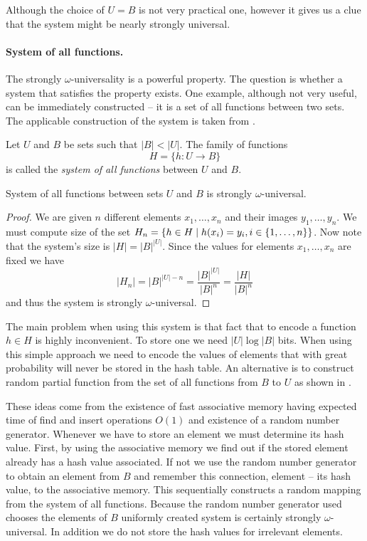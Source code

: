 Although the choice of $U = B$ is not very practical one, however it gives us a clue that the system might be nearly strongly universal.

\paragraph{System of all functions.}
The strongly $\omega$-universality is a powerful property. The question is whether a system that satisfies the property exists. One example, although not very useful, can be immediately constructed -- it is a set of all functions between two sets. The applicable construction of the system is taken from \cite{1382617}.

\begin{definition}
Let $U$ and $B$ be sets such that $|B| < |U|$. The family of functions
\[
H = \{h: U \rightarrow B \}
\]
is called the \emph{system of all functions} between $U$ and $B$.
\end{definition}

\begin{remark}
System of all functions between sets $U$ and $B$ is strongly $\omega$-universal.
\end{remark}
\begin{proof}
We are given $n$ different elements $x_1, \dots, x_n$ and their images $y_1, \dots, y_n$. We must compute size of the set $H_n = \lbrace h \in H \mid h(x_i) = y_i, i \in \lbrace 1, \dots, n\rbrace \rbrace$. Now note that the system's size is $|H| = {|B|}^{|U|}$. Since the values for elements $x_1, \dots, x_n$ are fixed we have \[ |H_n| = {|B|}^{|U| - n} = \frac{{|B|}^{|U|}}{{|B|}^{n}} = \frac{|H|}{|B|^n} \] and thus the system is strongly $\omega$-universal.
\end{proof}

The main problem when using this system is that fact that to encode a function $h \in H$ is highly inconvenient. To store one we need $|U| \log |B|$ bits. When using this simple approach we need to encode the values of elements that with great probability will never be stored in the hash table. An alternative is to construct random partial function from the set of all functions from $B$ to $U$ as shown in \cite{1382617}. 

These ideas come from the existence of fast associative memory having expected time of find and insert operations $O(1)$ and existence of a random number generator. Whenever we have to store an element we must determine its hash value. First, by using the associative memory we find out if the stored element already has a hash value associated. If not we use the random number generator to obtain an element from $B$ and remember this connection, element -- its hash value, to the associative memory. This sequentially constructs a random mapping from the system of all functions. Because the random number generator used chooses the elements of $B$ uniformly created system is certainly strongly $\omega$-universal. In addition we do not store the hash values for irrelevant elements. 

